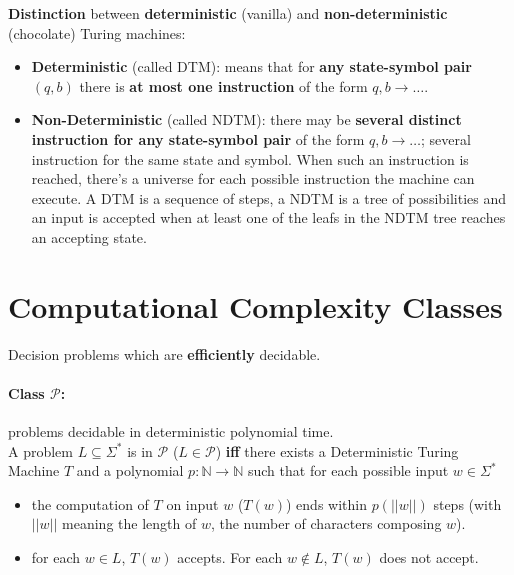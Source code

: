 	\textbf{Distinction} between \textbf{deterministic} (vanilla) and \textbf{non-deterministic} (chocolate) Turing machines:
	\begin{itemize}
		\item \textbf{Deterministic} (called DTM): means that for \textbf{any state-symbol pair} $(q,b)$ there is \textbf{at most one instruction} of the form $q,b \rightarrow \dots$.\\

		\item \textbf{Non-Deterministic} (called NDTM): there may be \textbf{several distinct instruction for any state-symbol pair} of the form $q,b \rightarrow \dots$; several instruction for the same state and symbol. When such an instruction is reached, there's a universe for each possible instruction the machine can execute. A DTM is a sequence of steps, a NDTM is a tree of possibilities and an input is accepted when at least one of the leafs in the NDTM tree reaches an accepting state.\\
	\end{itemize}

	\newpage

	\section{Computational Complexity Classes}

	Decision problems which are \textbf{efficiently} decidable.\\

	\paragraph{Class $\mathcal{P}$:} problems decidable in deterministic polynomial time.\\

	A problem $L \subseteq \Sigma^\ast$ is in $\mathcal{P}$ ($L \in \mathcal{P}$) \textbf{iff} there exists a Deterministic Turing Machine $T$ and a polynomial $p: \mathbb{N} \rightarrow \mathbb{N}$ such that for each possible input $w \in \Sigma^\ast$
	\begin{itemize}
		\item the computation of $T$ on input $w$ ($T(w)$) ends within $p(||w||)$ steps (with $||w||$ meaning the length of $w$, the number of characters composing $w$).
		\item for each $w \in L$, $T(w)$ accepts. For each $w \notin L$, $T(w)$ does not accept.
	\end{itemize}

